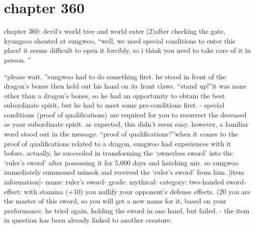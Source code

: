 \section{chapter 360}

chapter 360: devil’s world tree and world eater (2)after checking the gate, kyungsoo shouted at sungwoo, “well, we need special conditions to enter this place! it seems difficult to open it forcibly, so i think you need to take care of it in person.
”




“please wait.
”sungwoo had to do something first.
 he stood in front of the dragon’s bones then held out his hand on its front claws.
“stand up!”it was none other than a dragon’s bones, so he had an opportunity to obtain the best subordinate spirit, but he had to meet some pre-conditions first.
- special conditions (proof of qualifications) are required for you to resurrect the deceased as your subordinate spirit.
as expected, this didn’t seem easy.
 however, a familiar word stood out in the message.
“proof of qualifications?”when it comes to the proof of qualifications related to a dragon, sungwoo had experiences with it before.
 actually, he succeeded in transforming the ‘ownerless sword’ into the ‘ruler’s sword’ after possessing it for 5,000 days and hatching mir.
so sungwoo immediately summoned minsok and received the ‘ruler’s sword’ from him.
[item information]- name: ruler’s sword- grade: mythical- category: two-handed sword- effect: with stamina (+10) you nullify your opponent’s defense effects.
 (20%
 you are the master of this sword, so you will get a new name for it, based on your performance.
he tried again, holding the sword in one hand, but failed.
- the item in question has been already linked to another creature.

